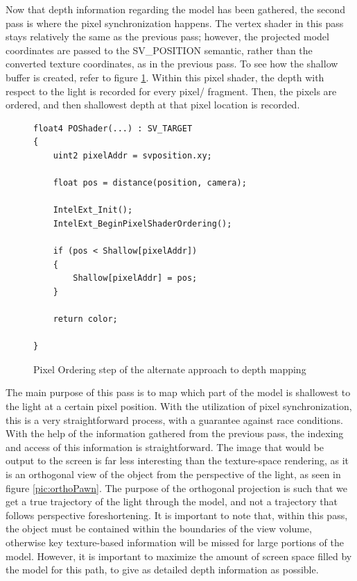 \documentclass[a4paper, 12pt]{article}
\begin{document}
Now that depth information regarding the model has been gathered, the second
pass is where the pixel synchronization happens. The vertex shader in this
pass stays relatively the same as the previous pass; however, the projected
model coordinates are passed to the SV\_POSITION semantic, rather than the
converted texture coordinates, as in the previous pass. To see how the shallow
buffer is created, refer to figure \ref{code:POShader}. Within this pixel
shader, the depth with respect to the light is recorded for every pixel/
fragment. Then, the pixels are ordered, and then shallowest depth at that
pixel location is recorded.

\begin{figure}[!htb]
\begin{lstlisting}[breaklines=true, language=HLSL]
float4 POShader(...) : SV_TARGET
{
	uint2 pixelAddr = svposition.xy;

	float pos = distance(position, camera);

	IntelExt_Init();
	IntelExt_BeginPixelShaderOrdering();

	if (pos < Shallow[pixelAddr])
	{
		Shallow[pixelAddr] = pos;
	}

	return color;
	
}

\end{lstlisting}
\caption{Pixel Ordering step of the alternate approach to depth mapping}
\label{code:POShader}
\end{figure}

\noindent The main purpose of this pass is to map which part of the model is
shallowest to the light at a certain pixel position. With the utilization of
pixel synchronization, this is a very straightforward process, with a
guarantee against race conditions. With the help of the information gathered
from the previous pass, the indexing and access of this information is
straightforward. The image that would be output to the screen is far less
interesting than the texture-space rendering, as it is an orthogonal view of
the object from the perspective of the light, as seen in figure
\ref{pic:orthoPawn}. The purpose of the orthogonal projection is such that we
get a true trajectory of the light through the model, and not a trajectory
that follows perspective foreshortening. It is important to note that, within
this pass, the object must be contained within the boundaries of the view
volume, otherwise key texture-based information will be missed for large
portions of the model. However, it is important to maximize the amount of
screen space filled by the model for this path, to give as detailed depth
information as possible.
\end{document}
